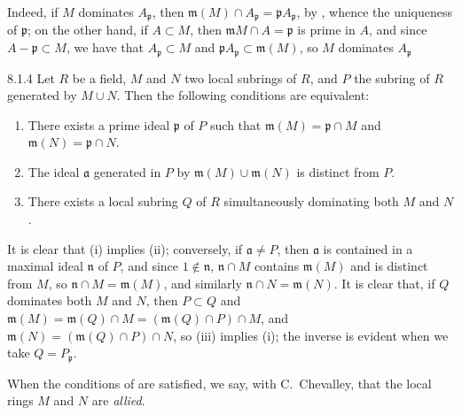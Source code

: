 Indeed, if $M$ dominates $A_\mathfrak{p}$, then $\mathfrak{m}(M)\cap
A_\mathfrak{p}=\mathfrak{p}A_\mathfrak{p}$, by , whence the
uniqueness of $\mathfrak{p}$; on the other hand, if $A\subset M$, then
$\mathfrak{m}M\cap A=\mathfrak{p}$ is prime in $A$, and since
$A-\mathfrak{p}\subset M$, we have that $A_\mathfrak{p}\subset M$ and
$\mathfrak{p}A_\mathfrak{p}\subset\mathfrak{m}(M)$, so $M$ dominates
$A_\mathfrak{p}$

\begin{envs}[Lemma]{8.1.4}
\label{lem-1.8.1.4}
Let $R$ be a field, $M$ and $N$ two local
subrings of $R$, and $P$ the subring of $R$ generated by $M\cup N$. Then the
following conditions are equivalent:
\begin{enumerate}[label=\rm{(\roman*)}]
  \item There exists a prime ideal $\mathfrak{p}$ of $P$ such that
        $\mathfrak{m}(M)=\mathfrak{p}\cap M$ and $\mathfrak{m}(N)=\mathfrak{p}\cap N$.
  \item The ideal $\mathfrak{a}$ generated in $P$ by $\mathfrak{m}(M)\cup\mathfrak{m}(N)$ is
        distinct from $P$.
  \item There exists a local subring $Q$ of $R$ simultaneously dominating both $M$ and $N$.
\end{enumerate}
\end{envs}

It is clear that (i) implies (ii); conversely, if $\mathfrak{a}\neq P$, then
$\mathfrak{a}$ is contained in a maximal ideal $\mathfrak{n}$ of $P$, and since
$1\not\in\mathfrak{n}$, $\mathfrak{n}\cap M$ contains $\mathfrak{m}(M)$ and is
distinct from $M$, so $\mathfrak{n}\cap M=\mathfrak{m}(M)$, and similarly
$\mathfrak{n}\cap N=\mathfrak{m}(N)$. It is clear that, if $Q$ dominates both
$M$ and $N$, then $P\subset Q$ and
$\mathfrak{m}(M)=\mathfrak{m}(Q)\cap M=(\mathfrak{m}(Q)\cap P)\cap M$, and
$\mathfrak{m}(N)=(\mathfrak{m}(Q)\cap P)\cap N$, so (iii) implies (i); the inverse is evident
when we take $Q=P_\mathfrak{p}$.

When the conditions of  are satisfied, we say, with C.~Chevalley,
that the local rings $M$ and $N$ are \emph{allied}.


